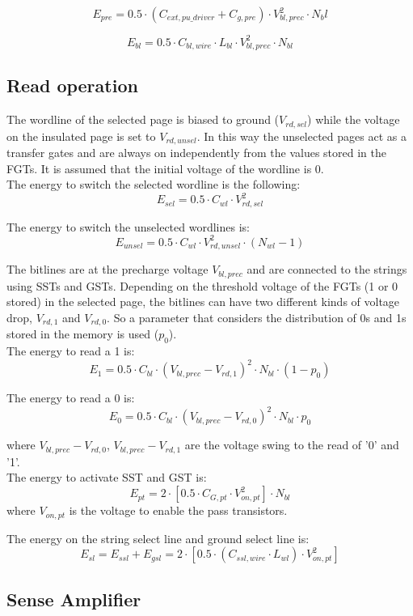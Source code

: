 \[
E_{pre}= 0.5 \cdot (C_{ext,pu\_driver}+C_{g,pre}) \cdot V_{bl,prec}^2 \cdot N_bl
\]

\[
E_{bl}= 0.5 \cdot C_{bl,wire} \cdot L_{bl} \cdot V_{bl,prec}^2 \cdot N_{bl}
\]

\subsection{Read operation}
\label{sec:read_op}

The wordline of the selected page is biased to ground ($V_{rd,sel}$) while the voltage on the insulated page is set to $V_{rd,unsel}$. In this way the unselected pages act as a transfer gates and are always on independently from the values stored in the FGTs. It is assumed that the initial voltage of the wordline is 0.\\

The energy to switch the selected wordline is the following:
\[
E_{sel}= 0.5 \cdot C_{wl} \cdot V_{rd,sel} ^2
\]

The energy to switch the unselected wordlines is:
\[
E_{unsel}= 0.5 \cdot C_{wl}  \cdot V_{rd,unsel}^2 \cdot (N_{wl}-1)
\]

The bitlines are at the precharge voltage $V_{bl,prec}$ and are connected to the strings using SSTs and GSTs. Depending on the threshold voltage of the FGTs (1 or 0 stored) in the selected page, the bitlines can have two different kinds of voltage drop, $V_{rd,1}$ and $V_{rd,0}$. So a parameter that considers the distribution of 0s and 1s stored in the memory is used ($p_0$).\\

The energy to read a 1 is:
\[
E_1=0.5 \cdot C_{bl} \cdot (V_{bl,prec}-V_{rd,1})^2 \cdot N_{bl} \cdot (1-p_0)
\]

The energy to read a 0 is:
\[
E_0=0.5 \cdot C_{bl} \cdot (V_{bl,prec}-V_{rd,0})^2 \cdot N_{bl} \cdot p_0
\]

where $V_{bl,prec}-V_{rd,0}$, $V_{bl,prec}-V_{rd,1}$ are the voltage swing to the read of '0' and '1'.\\
The energy to activate SST and GST is:
\[
E_{pt}= 2 \cdot [0.5 \cdot C_{G,pt} \cdot V_{on,pt}^2] \cdot N_{bl}
\]
where $V_{on,pt}$ is the voltage to enable the pass transistors.

The energy on the string select line and ground select  line is:
\[
E_{sl}=E_{ssl}+ E_{gsl} = 2 \cdot [0.5 \cdot (C_{ssl,wire}\cdot L_{wl}) \cdot V_{on,pt}^2]
\]

\subsection{Sense Amplifier}
\label{sec:sense_amp}

